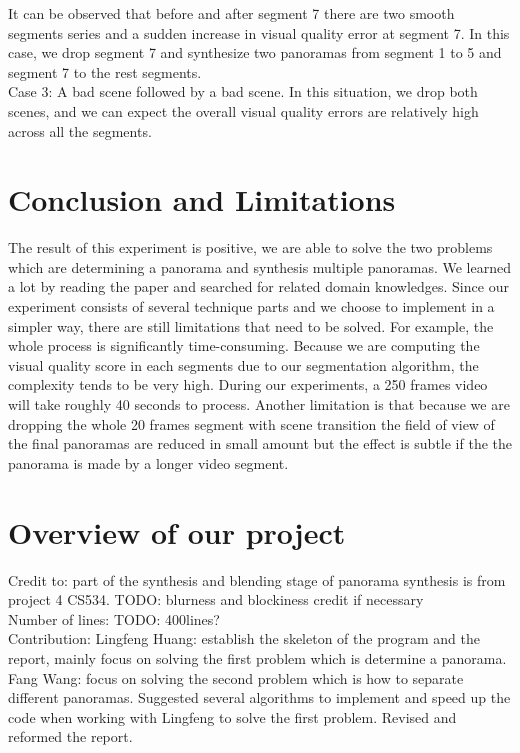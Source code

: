 \documentclass[12pt]{article}
\begin{document}
It can be observed that before and after segment 7 there are two smooth segments series and a sudden increase in visual quality error at segment 7. In this case, we drop segment 7 and synthesize two panoramas from segment 1 to 5 and segment 7 to the rest segments.\\
Case 3: A bad scene followed by a bad scene. In this situation, we drop both scenes, and we can expect the overall visual quality errors are relatively high across all the segments.

\section{Conclusion and Limitations}
The result of this experiment is positive, we are able to solve the two problems which are determining a panorama and synthesis multiple panoramas. We learned a lot by reading the paper and searched for related domain knowledges. Since our experiment consists of several technique parts and we choose to implement in a simpler way, there are still limitations that need to be solved. For example, the whole process is significantly time-consuming. Because we are computing the visual quality score in each segments due to our segmentation algorithm, the complexity tends to be very high. During our experiments, a 250 frames video will take roughly 40 seconds to process. Another limitation is that because we are dropping the whole 20 frames segment with scene transition the field of view of the final panoramas are reduced in small amount but the effect is subtle if the the panorama is made by a longer video segment. 

\section{Overview of our project}
Credit to: part of the synthesis and blending stage of panorama synthesis is from project 4 CS534. TODO: blurness and blockiness credit if necessary\\
Number of lines: TODO: 400lines?\\
Contribution: 
Lingfeng Huang: establish the skeleton of the program and the report, mainly focus on solving the first problem which is determine a panorama. 
Fang Wang: focus on solving the second problem which is how to separate different panoramas. Suggested several algorithms to implement and speed up the code when working with Lingfeng to solve the first problem. Revised and reformed the report.
\end{document}
